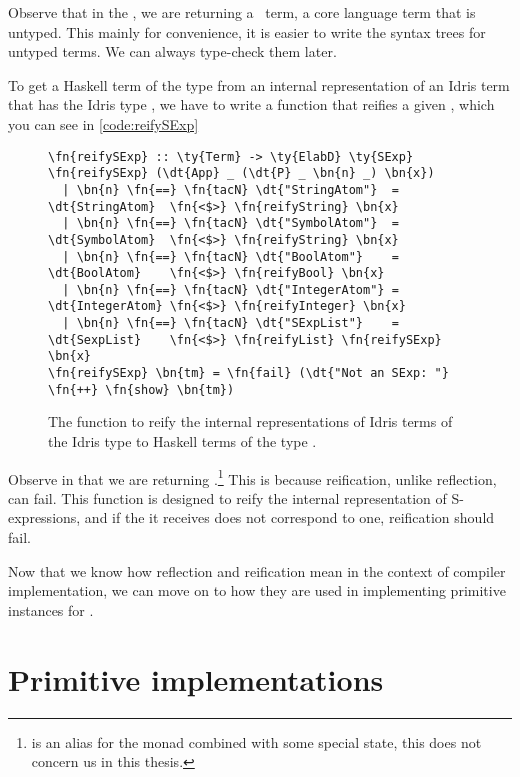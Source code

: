 Observe that in the , we are returning a \Raw\ term, a core
language term that is untyped. This mainly for convenience, it is easier to
write the syntax trees for untyped terms. We can always type-check them later.

To get a Haskell term of the type  from an internal representation of
an Idris term that has the Idris type , we have to write a function
 that reifies a given , which you can see in
\autoref{code:reifySExp}

\begin{figure}[ht]
\caption{The function to reify the internal representations of Idris terms
  of the Idris type  to Haskell terms of the type .}
\label{code:reifySExp}
\begin{Verbatim}[framesep=2mm, label=\footnotesize{\normalfont{Haskell}}, labelposition=topline]
\fn{reifySExp} :: \ty{Term} -> \ty{ElabD} \ty{SExp}
\fn{reifySExp} (\dt{App} _ (\dt{P} _ \bn{n} _) \bn{x})
  | \bn{n} \fn{==} \fn{tacN} \dt{"StringAtom"}  = \dt{StringAtom}  \fn{<$>} \fn{reifyString} \bn{x}
  | \bn{n} \fn{==} \fn{tacN} \dt{"SymbolAtom"}  = \dt{SymbolAtom}  \fn{<$>} \fn{reifyString} \bn{x}
  | \bn{n} \fn{==} \fn{tacN} \dt{"BoolAtom"}    = \dt{BoolAtom}    \fn{<$>} \fn{reifyBool} \bn{x}
  | \bn{n} \fn{==} \fn{tacN} \dt{"IntegerAtom"} = \dt{IntegerAtom} \fn{<$>} \fn{reifyInteger} \bn{x}
  | \bn{n} \fn{==} \fn{tacN} \dt{"SExpList"}    = \dt{SexpList}    \fn{<$>} \fn{reifyList} \fn{reifySExp} \bn{x}
\fn{reifySExp} \bn{tm} = \fn{fail} (\dt{"Not an SExp: "} \fn{++} \fn{show} \bn{tm})
\end{Verbatim}
\end{figure}

Observe in  that we are returning
.\footnote{ is an alias for the  monad
combined with some special state, this does not concern us in this thesis.}
This is because reification, unlike reflection, can fail. This function is
designed to reify the internal representation of S-expressions, and if the
 it receives does not correspond to one, reification should fail.

Now that we know how reflection and reification mean in the context of compiler
implementation, we can move on to how they are used in implementing primitive
instances for .

\section{Primitive  implementations}\label{sec:primitiveEditorableImpl}

